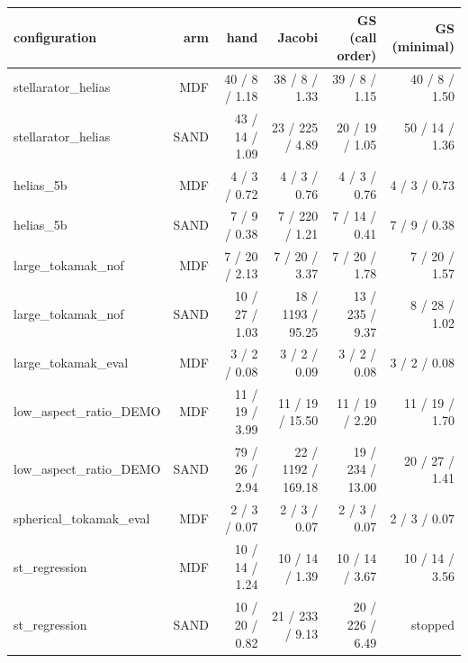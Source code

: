 \begin{tabular}{lrrrrr}
\toprule
configuration & arm & hand & Jacobi & GS (call order) & GS (minimal) \\
\midrule
stellarator\_helias & MDF & 40 / 8 / 1.18 & 38 / 8 / 1.33 & 39 / 8 / 1.15 & 40 / 8 / 1.50 \\
stellarator\_helias & SAND & 43 / 14 / 1.09 & 23 / 225 / 4.89 & 20 / 19 / 1.05 & 50 / 14 / 1.36 \\
helias\_5b & MDF & 4 / 3 / 0.72 & 4 / 3 / 0.76 & 4 / 3 / 0.76 & 4 / 3 / 0.73 \\
helias\_5b & SAND & 7 / 9 / 0.38 & 7 / 220 / 1.21 & 7 / 14 / 0.41 & 7 / 9 / 0.38 \\
large\_tokamak\_nof & MDF & 7 / 20 / 2.13 & 7 / 20 / 3.37 & 7 / 20 / 1.78 & 7 / 20 / 1.57 \\
large\_tokamak\_nof & SAND & 10 / 27 / 1.03 & 18 / 1193 / 95.25 & 13 / 235 / 9.37 & 8 / 28 / 1.02 \\
large\_tokamak\_eval & MDF & 3 / 2 / 0.08 & 3 / 2 / 0.09 & 3 / 2 / 0.08 & 3 / 2 / 0.08 \\
low\_aspect\_ratio\_DEMO & MDF & 11 / 19 / 3.99 & 11 / 19 / 15.50 & 11 / 19 / 2.20 & 11 / 19 / 1.70 \\
low\_aspect\_ratio\_DEMO & SAND & 79 / 26 / 2.94 & 22 / 1192 / 169.18 & 19 / 234 / 13.00 & 20 / 27 / 1.41 \\
spherical\_tokamak\_eval & MDF & 2 / 3 / 0.07 & 2 / 3 / 0.07 & 2 / 3 / 0.07 & 2 / 3 / 0.07 \\
st\_regression & MDF & 10 / 14 / 1.24 & 10 / 14 / 1.39 & 10 / 14 / 3.67 & 10 / 14 / 3.56 \\
st\_regression & SAND & 10 / 20 / 0.82 & 21 / 233 / 9.13 & 20 / 226 / 6.49 & stopped \\
\bottomrule
\end{tabular}
